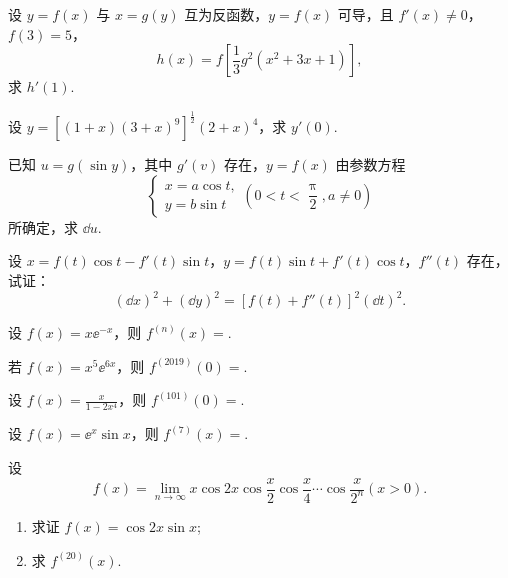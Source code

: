 	\begin{ti}
		设 $y = f(x)$ 与 $x = g(y)$ 互为反函数，$y = f(x)$ 可导，且 $f'(x) \ne 0$，$f(3) = 5$，
		\[
			h(x) = f\left[ \frac{1}{3} g^{2}\left( x^{2} + 3x + 1 \right) \right],
		\]
		求 $h'(1)$.
	\end{ti}

	\begin{ti}
		设 $y = \left[ (1 + x)(3 + x)^{9} \right]^{\frac{1}{2}} (2 + x)^{4}$，求 $y'(0)$.
	\end{ti}

	\begin{ti}
		已知 $u = g(\sin y)$，其中 $g'(v)$ 存在，$y = f(x)$ 由参数方程
		\[
			\begin{cases}
				x = a \cos t,\\
				y = b \sin t
			\end{cases}
			\left( 0 < t < \frac{\uppi}{2}, a \ne 0 \right)
		\]
		所确定，求 $\dd{u}$.
	\end{ti}

	\begin{ti}
		设 $x = f(t) \cos t - f'(t) \sin t$，$y = f(t) \sin t + f'(t) \cos t$，$f''(t)$ 存在，试证：
		\[
			(\dd{x})^{2} + (\dd{y})^{2} = \left[ f(t) + f''(t) \right]^{2} (\dd{t})^{2}.
		\]
	\end{ti}

	\begin{ti}
		设 $f(x) = x \ee^{-x}$，则 $f^{(n)}(x) = $\kuo.
		
	\end{ti}

	\begin{ti}
		若 $f(x) = x^{5} \ee^{6x}$，则 $f^{(2019)}(0) = $\htwo.
	\end{ti}

	\begin{ti}
		设 $f(x) = \frac{x}{1 - 2x^{4}}$，则 $f^{(101)}(0) = $\htwo.
	\end{ti}

	\begin{ti}
		设 $f(x) = \ee^{x} \sin x$，则 $f^{(7)}(x) = $\htwo.
	\end{ti}

	\begin{ti}
		设 \[f(x) = \lim_{n \to \infty} x \cos 2x \cos \frac{x}{2} \cos \frac{x}{4} \cdots \cos \frac{x}{2^{n}}(x > 0).\]
		\begin{enumerate}
			\item 求证 $f(x) = \cos 2x \sin x$;
			\item 求 $f^{(20)}(x)$.
		\end{enumerate}
	\end{ti}

